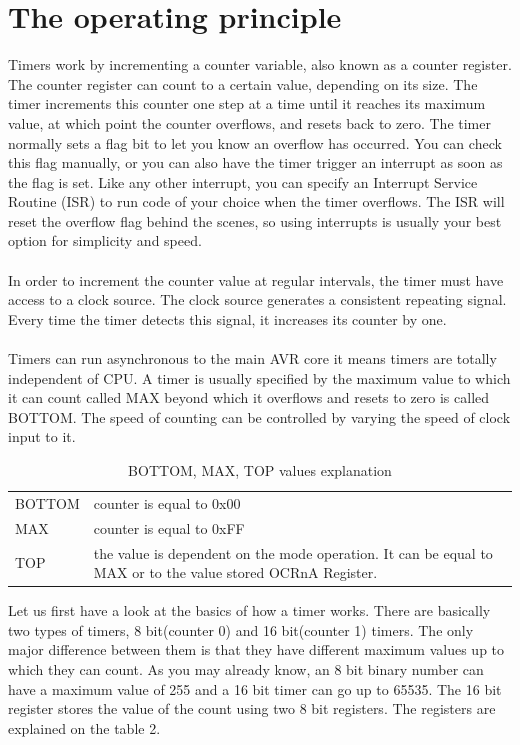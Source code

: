 \documentclass[english]{article}
\begin{document}
\section{The operating principle}
Timers work by incrementing a counter variable, also known as a counter register. The counter register can count to a certain value, depending on its size. The timer increments this counter one step at a time until it reaches its maximum value, at which point the counter overflows, and resets back to zero. The timer normally sets a flag bit to let you know an overflow has occurred. You can check this flag manually, or you can also have the timer trigger an interrupt as soon as the flag is set. Like any other interrupt, you can specify an Interrupt Service Routine (ISR) to run code of your choice when the timer overflows. The ISR will reset the overflow flag behind the scenes, so using interrupts is usually your best option for simplicity and speed.\\\\
In order to increment the counter value at regular intervals, the timer must have access to a clock source.  The clock source generates a consistent repeating signal.  Every time the timer detects this signal, it increases its counter by one.\\\\
Timers can run asynchronous to the main AVR core it means timers are totally independent of CPU. A timer is usually specified by the maximum value to which it can count called MAX beyond which it overflows and resets to zero is called BOTTOM. The speed of counting can be controlled by varying the speed of clock input to it.
\begin{table}[H]
\caption{BOTTOM, MAX, TOP values explanation}
\begin{tabular}{ l| l }
BOTTOM & counter is equal to 0x00\\
MAX & counter is equal to 0xFF\\
TOP & the value is dependent on the mode operation. It can be equal to MAX or to the value stored OCRnA Register.
\end{tabular}
\end{table}
Let us first have a look at the basics of how a timer works. There are basically two types of timers, 8 bit(counter 0) and 16 bit(counter 1) timers. The only major difference between them is that they have different maximum values up to which they can count. As you may already know, an 8 bit binary number can have a maximum value of 255 and a 16 bit timer can go up to 65535. The 16 bit register stores the value of the count using two 8 bit registers. The registers are explained on the table 2.
\end{document}
